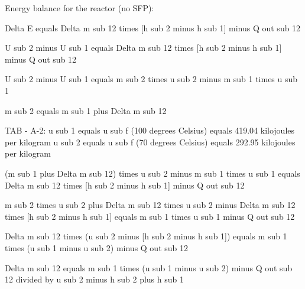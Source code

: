 Energy balance for the reactor (no SFP):  

Delta E equals Delta m sub 12 times [h sub 2 minus h sub 1] minus Q out sub 12  

U sub 2 minus U sub 1 equals Delta m sub 12 times [h sub 2 minus h sub 1] minus Q out sub 12  

U sub 2 minus U sub 1 equals m sub 2 times u sub 2 minus m sub 1 times u sub 1  

m sub 2 equals m sub 1 plus Delta m sub 12  

TAB - A-2:  
u sub 1 equals u sub f (100 degrees Celsius) equals 419.04 kilojoules per kilogram  
u sub 2 equals u sub f (70 degrees Celsius) equals 292.95 kilojoules per kilogram  

(m sub 1 plus Delta m sub 12) times u sub 2 minus m sub 1 times u sub 1 equals Delta m sub 12 times [h sub 2 minus h sub 1] minus Q out sub 12  

m sub 2 times u sub 2 plus Delta m sub 12 times u sub 2 minus Delta m sub 12 times [h sub 2 minus h sub 1] equals m sub 1 times u sub 1 minus Q out sub 12  

Delta m sub 12 times (u sub 2 minus [h sub 2 minus h sub 1]) equals m sub 1 times (u sub 1 minus u sub 2) minus Q out sub 12  

Delta m sub 12 equals m sub 1 times (u sub 1 minus u sub 2) minus Q out sub 12 divided by u sub 2 minus h sub 2 plus h sub 1